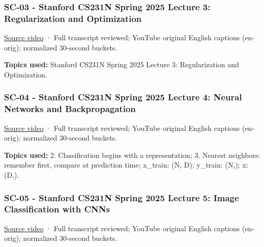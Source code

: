 \subsubsection{SC-03 - Stanford CS231N Spring 2025 Lecture 3: Regularization and Optimization}\label{04-visual-computing-ii-ch036-sc-03---stanford-cs231n-spring-2025-lecture-3-regularization-and-optimization}

\hypertarget{04-visual-computing-ii-ch036-sc-03---stanford-cs231n-spring-2025-lecture-3-regularization-and-optimization}{}

\href{https://www.youtube.com/watch?v=dyNGd06MWn4}{Source video} · Full transcript reviewed; YouTube original English captions (en-orig); normalized 30-second buckets.

\textbf{Topics used:} Stanford CS231N \textbar{} Spring 2025 \textbar{} Lecture 3: Regularization and Optimization.

\subsubsection{SC-04 - Stanford CS231N Spring 2025 Lecture 4: Neural Networks and Backpropagation}\label{04-visual-computing-ii-ch036-sc-04---stanford-cs231n-spring-2025-lecture-4-neural-networks-and-backpropagation}

\hypertarget{04-visual-computing-ii-ch036-sc-04---stanford-cs231n-spring-2025-lecture-4-neural-networks-and-backpropagation}{}

\href{https://www.youtube.com/watch?v=25zD5qJHYsk}{Source video} · Full transcript reviewed; YouTube original English captions (en-orig); normalized 30-second buckets.

\textbf{Topics used:} 2. Classification begins with a representation; 3. Nearest neighbors: remember first, compare at prediction time; x\_train: (N, D); y\_train: (N,); x: (D,).

\subsubsection{SC-05 - Stanford CS231N Spring 2025 Lecture 5: Image Classification with CNNs}\label{04-visual-computing-ii-ch036-sc-05---stanford-cs231n-spring-2025-lecture-5-image-classification-with-cnns}

\hypertarget{04-visual-computing-ii-ch036-sc-05---stanford-cs231n-spring-2025-lecture-5-image-classification-with-cnns}{}

\href{https://www.youtube.com/watch?v=f3g1zGdxptI}{Source video} · Full transcript reviewed; YouTube original English captions (en-orig); normalized 30-second buckets.

